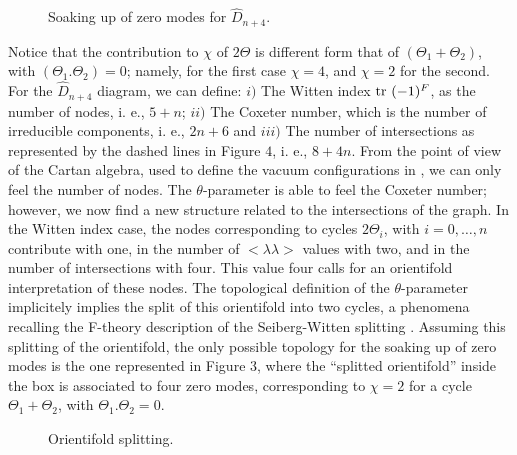 

\begin{figure}[ht]
\def\epsfsize#1#2{.6#1}
\centerline{}
\caption{Soaking up of zero modes for $\hat{D}_{n+4}$.}
\end{figure}





 Notice that the contribution to $\chi$ of $2 \Theta$ is different form that 
of $(\Theta_1 + \Theta_2)$, with $(\Theta_1 . \Theta_2)=0$;
namely, for the first case $\chi=4$, and $\chi=2$ for the second.
For the $\hat{D}_{n+4}$ diagram, we can define: $i)$ The Witten
index $\hbox {tr }(-1)^F$, as the number of nodes, i. e., $5+n$;
$ii)$ The Coxeter number, which is the number of irreducible
components, i. e., $2n+6$ and $iii)$ The number of intersections
as represented by the dashed lines in Figure $4$, i. e.,
$8+4n$. From the point of view of the Cartan algebra, used to
define the vacuum configurations in \cite{Wind}, we can only feel
the number of nodes. The $\theta$-parameter is able to feel the
Coxeter number; however, we now find a new structure related to
the intersections of the graph. In the Witten index case, the
nodes corresponding to cycles $2 \Theta_i$, with $i=0, \ldots ,n$
contribute with one, in the number of $<\lambda \lambda>$ values
with two, and in the number of intersections with four. This
value four calls for an orientifold interpretation of these
nodes. The topological definition of the $\theta$-parameter
implicitely implies the split of this orientifold into two
cycles, a phenomena recalling the F-theory description \cite{Sen}
of the Seiberg-Witten splitting \cite{SW}. Assuming this
splitting of the orientifold, the only possible topology for the
soaking up of zero modes is the one represented in Figure $3$,
where the ``splitted orientifold'' inside the box is associated
to four zero modes, corresponding to $\chi=2$ for a cycle
$\Theta_1 + \Theta_2$, with $\Theta_1 . \Theta_2=0$. 



\begin{figure}[ht]
\def\epsfsize#1#2{.6#1}
\centerline{}
\caption{Orientifold splitting.}
\end{figure}

